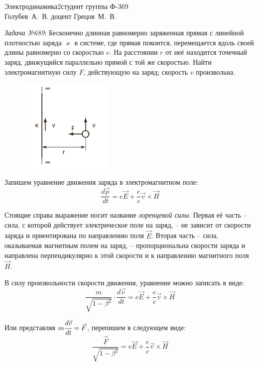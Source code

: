 




{Электродинамика}{2}{}{студент группы Ф-369\\Голубев~А.~В.}
{}{доцент Грецов~М.~В.}{}{}

\newcommand{\grad}{\mathrm{grad}\,}

\newpage
\emph{Задача №689}: Бесконечно длинная равномерно заряженная прямая с линейной
плотностью заряда \( \varkappa \) в системе, где прямая покоится, перемещается
вдоль своей длины равномерно со скоростью \( v \). На расстоянии \( r \) от неё
находится точечный заряд, движущийся параллельно прямой с той же скоростью. 
Найти электромагнитную силу \( F \), действующую на заряд; скорость \( v \)
произвольна.
\begin{figure}[ht]
    \center
	\includegraphics[width=0.4\textwidth]{pdf/01.pdf}
\end{figure}

Запишем уравнение движения заряда в электромагнитном поле:
\[ \frac{d\vec{p}}{dt} = e\vec{E} + \frac{e}{c}\vec{v}\times\vec{H} \]

Стоящие справа выражение носит название \emph{лоренцевой силы}. Первая её 
часть -- сила, с которой действует электрическое поле на заряд, -- не зависит 
от скорости заряда и ориентирована по направлению поля \( \vec{E} \). Вторая 
часть -- сила, оказываемая магнитным полем на заряд, -- пропорциональна скорости 
заряда и направлена перпендикулярно к этой скорости и к направлению магнитного 
поля \( \vec{H} \).

В силу произвольности скорости движения, уравнение можно записать в виде:
\[ 
	\frac{m}{\sqrt{1-\beta^2}}\cdot\frac{d\vec{v}}{dt} = 
	e\vec{E} + \frac{e}{c}\vec{v}\times\vec{H} 
\]

Или представляя \( m\cfrac{d\vec{v}}{dt} = \vec{F} \), перепишем в следующем виде:
\[ \frac{\vec{F}}{\sqrt{1-\beta^2}} = e\vec{E} + \frac{e}{c}\vec{v}\times\vec{H} \]

